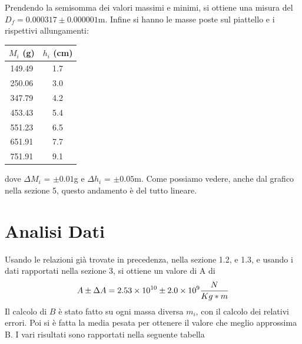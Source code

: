 \documentclass[a4paper]{article}
\begin{document}
Prendendo la semisomma dei valori massimi e minimi, si ottiene una misura del $D_f = 0.000317 \pm{0.000001}$m. Infine si hanno le masse poste sul piattello e i rispettivi allungamenti:
\begin{table} [!h]
    \centering
    \begin{tabular}{|c|c|}
    \hline
    $M_i$ (g) & $h_i$ (cm)\\
    \hline
    149.49 & 1.7 \\
    250.06 & 3.0 \\
    347.79 & 4.2 \\
    453.43 & 5.4 \\
    551.23 & 6.5 \\
    651.91 & 7.7 \\
    751.91 & 9.1 \\
    \hline
    \end{tabular}
\end{table}
\FloatBarrier
dove $\Delta M_i$ = $\pm{0.01}$g e $\Delta h_i$ = $\pm{0.05}$m. Come possiamo vedere, anche dal grafico nella sezione 5, questo andamento è del tutto lineare. 
\FloatBarrier

\section{Analisi Dati}
Usando le relazioni già trovate in precedenza, nella sezione 1.2, e 1.3, e usando i dati rapportati nella sezione 3, si ottiene un valore di A di 
\begin{equation}
    A \pm{\Delta A} = \SI{2.53E10}{} \pm{\SI{2.0E9}{}} \frac{N}{Kg*m}
\end{equation}
Il calcolo di $B$ è stato fatto su ogni massa diversa $m_i$, con il calcolo dei relativi errori. Poi si è fatta la media pesata per ottenere il valore che meglio approssima B. I vari risultati sono rapportati nella seguente tabella
\end{document}

